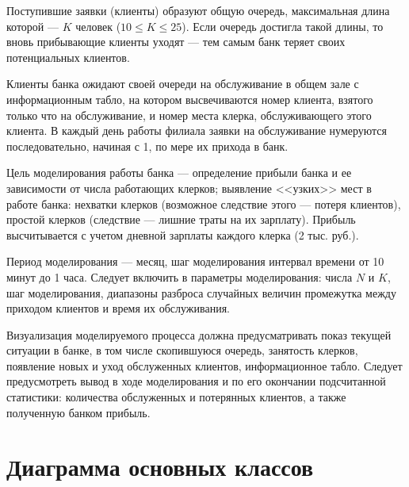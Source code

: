 \documentclass[oneside,final,12pt]{article}
\begin{document}
Поступившие заявки (клиенты) образуют общую очередь, максимальная длина которой --- $K$ человек ($10 \leq K \leq 25$). Если очередь достигла такой длины, то вновь прибывающие клиенты уходят --- тем самым банк теряет своих потенциальных клиентов.

Клиенты банка ожидают своей очереди на обслуживание в общем зале с информационным табло, на котором высвечиваются номер клиента, взятого только что на обслуживание, и номер места клерка, обслуживающего этого клиента. В каждый день работы филиала заявки на обслуживание нумеруются последовательно, начиная с 1, по мере их прихода в банк.

Цель моделирования работы банка --- определение прибыли банка и ее зависимости от числа работающих клерков; выявление <<узких>> мест в работе банка: нехватки клерков (возможное следствие этого --- потеря клиентов), простой клерков (следствие --- лишние траты на их зарплату). Прибыль высчитывается с учетом дневной зарплаты каждого клерка (2 тыс. руб.).

Период моделирования --- месяц, шаг моделирования интервал времени от 10 минут до 1 часа. Следует включить в параметры моделирования: числа $N$ и $K$, шаг моделирования, диапазоны разброса случайных величин промежутка между приходом клиентов и время их обслуживания.

Визуализация моделируемого процесса должна предусматривать показ текущей ситуации в банке, в том числе скопившуюся очередь, занятость клерков, появление новых и уход обслуженных клиентов, информационное табло. Следует предусмотреть вывод в ходе моделирования и по его окончании подсчитанной статистики: количества обслуженных и потерянных клиентов, а также полученную банком прибыль.

\clearpage
\section{Диаграмма основных классов}
\end{document}
